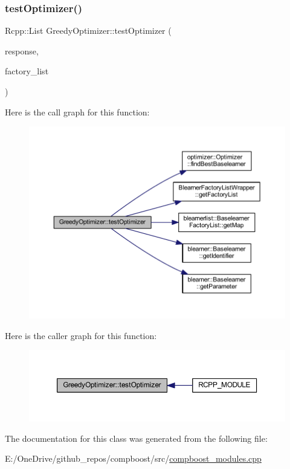 \subsubsection{\texorpdfstring{test\+Optimizer()}{testOptimizer()}}
{\footnotesize\ttfamily Rcpp\+::\+List Greedy\+Optimizer\+::test\+Optimizer (\begin{DoxyParamCaption}\item[{arma\+::vec \&}]{response,  }\item[{\mbox{\hyperlink{class_blearner_factory_list_wrapper}{Blearner\+Factory\+List\+Wrapper}}}]{factory\+\_\+list }\end{DoxyParamCaption})\hspace{0.3cm}{\ttfamily [inline]}}

Here is the call graph for this function\+:\nopagebreak
\begin{figure}[H]
\begin{center}
\leavevmode
\includegraphics[width=350pt]{class_greedy_optimizer_a30925396579c7cfb5b90b8c131495f3a_cgraph}
\end{center}
\end{figure}
Here is the caller graph for this function\+:\nopagebreak
\begin{figure}[H]
\begin{center}
\leavevmode
\includegraphics[width=350pt]{class_greedy_optimizer_a30925396579c7cfb5b90b8c131495f3a_icgraph}
\end{center}
\end{figure}


The documentation for this class was generated from the following file\+:\begin{DoxyCompactItemize}
\item 
E\+:/\+One\+Drive/github\+\_\+repos/compboost/src/\mbox{\hyperlink{compboost__modules_8cpp}{compboost\+\_\+modules.\+cpp}}\end{DoxyCompactItemize}
